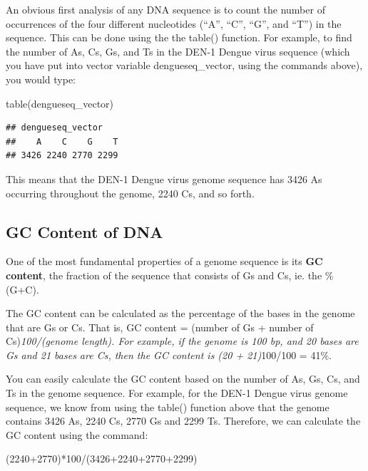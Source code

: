 \documentclass[
]{book}
\newenvironment{Shaded}{\begin{snugshade}}{\end{snugshade}}
\newcommand{\DecValTok}[1]{\textcolor[rgb]{0.00,0.00,0.81}{#1}}
\newcommand{\FunctionTok}[1]{\textcolor[rgb]{0.00,0.00,0.00}{#1}}
\newcommand{\NormalTok}[1]{#1}
\newcommand{\SpecialCharTok}[1]{\textcolor[rgb]{0.00,0.00,0.00}{#1}}
\begin{document}
An obvious first analysis of any DNA sequence is to count the number of occurrences of the four different nucleotides (``A'', ``C'', ``G'', and ``T'') in the sequence. This can be done using the the table() function. For example, to find the number of As, Cs, Gs, and Ts in the DEN-1 Dengue virus sequence (which you have put into vector variable dengueseq\_vector, using the commands above), you would type:

\begin{Shaded}
\begin{Highlighting}[]
\FunctionTok{table}\NormalTok{(dengueseq\_vector)}
\end{Highlighting}
\end{Shaded}

\begin{verbatim}
## dengueseq_vector
##    A    C    G    T 
## 3426 2240 2770 2299
\end{verbatim}

This means that the DEN-1 Dengue virus genome sequence has 3426 As occurring throughout the genome, 2240 Cs, and so forth.

\hypertarget{gc-content-of-dna}{%
\subsection{GC Content of DNA}\label{gc-content-of-dna}}

One of the most fundamental properties of a genome sequence is its \textbf{GC content}, the fraction of the sequence that consists of Gs and Cs, ie. the \%(G+C).

The GC content can be calculated as the percentage of the bases in the genome that are Gs or Cs. That is, GC content = (number of Gs + number of Cs)\emph{100/(genome length). For example, if the genome is 100 bp, and 20 bases are Gs and 21 bases are Cs, then the GC content is (20 + 21)}100/100 = 41\%.

You can easily calculate the GC content based on the number of As, Gs, Cs, and Ts in the genome sequence. For example, for the DEN-1 Dengue virus genome sequence, we know from using the table() function above that the genome contains 3426 As, 2240 Cs, 2770 Gs and 2299 Ts. Therefore, we can calculate the GC content using the command:

\begin{Shaded}
\begin{Highlighting}[]
\NormalTok{(}\DecValTok{2240}\SpecialCharTok{+}\DecValTok{2770}\NormalTok{)}\SpecialCharTok{*}\DecValTok{100}\SpecialCharTok{/}\NormalTok{(}\DecValTok{3426}\SpecialCharTok{+}\DecValTok{2240}\SpecialCharTok{+}\DecValTok{2770}\SpecialCharTok{+}\DecValTok{2299}\NormalTok{)}
\end{Highlighting}
\end{Shaded}
\end{document}

